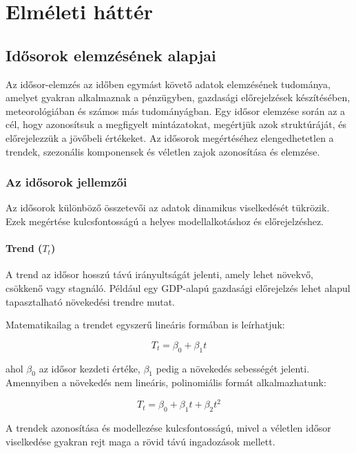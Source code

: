 \documentclass[11pt]{article}
\begin{document}
    \section{Elméleti háttér}\label{elmuxe9leti-huxe1ttuxe9r}

    \subsection{Idősorok elemzésének
alapjai}\label{idux151sorok-elemzuxe9suxe9nek-alapjai}

Az idősor-elemzés az időben egymást követő adatok elemzésének tudománya,
amelyet gyakran alkalmaznak a pénzügyben, gazdasági előrejelzések
készítésében, meteorológiában és számos más tudományágban. Egy idősor
elemzése során az a cél, hogy azonosítsuk a megfigyelt mintázatokat,
megértjük azok struktúráját, és előrejelezzük a jövőbeli értékeket. Az
idősorok megértéséhez elengedhetetlen a trendek, szezonális komponensek
és véletlen zajok azonosítása és elemzése.

    \subsubsection{Az idősorok
jellemzői}\label{az-idux151sorok-jellemzux151i}

Az idősorok különböző összetevői az adatok dinamikus viselkedését
tükrözik. Ezek megértése kulcsfontosságú a helyes modellalkotáshoz és
előrejelzéshez.

\paragraph{\texorpdfstring{Trend
(\(T_t\))}{Trend (T\_t)}}\label{trend-t_t}

A trend az idősor hosszú távú irányultságát jelenti, amely lehet
növekvő, csökkenő vagy stagnáló. Például egy GDP-alapú gazdasági
előrejelzés lehet alapul tapasztalható növekedési trendre mutat.

Matematikailag a trendet egyszerű lineáris formában is leírhatjuk:

\[T_t = \beta_0 + \beta_1 t\]

ahol \(\beta_0\) az idősor kezdeti értéke, \(\beta_1\) pedig a növekedés
sebességét jelenti. Amennyiben a növekedés nem lineáris, polinomiális
formát alkalmazhatunk:

\[T_t = \beta_0 + \beta_1 t + \beta_2 t^2\]

A trendek azonosítása és modellezése kulcsfontosságú, mivel a véletlen
idősor viselkedése gyakran rejt maga a rövid távú ingadozások mellett.
\end{document}
